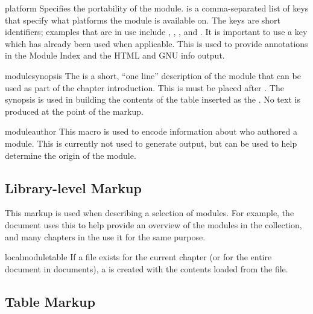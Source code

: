 \documentclass{howto}
\begin{document}
  \begin{macrodesc}{platform}{}
    Specifies the portability of the module.   is a
    comma-separated list of keys that specify what platforms the
    module is available on.  The keys are short identifiers;
    examples that are in use include , ,
    , and .  It is important to use a key
    which has already been used when applicable.  This is used to
    provide annotations in the Module Index and the HTML and GNU info
    output.
  \end{macrodesc}

  \begin{macrodesc}{modulesynopsis}{}
    The  is a short, ``one line'' description of the
    module that can be used as part of the chapter introduction.
    This is must be placed after .
    The synopsis is used in building the contents of the table
    inserted as the .  No text is
    produced at the point of the markup.
  \end{macrodesc}

  \begin{macrodesc}{moduleauthor}{}
    This macro is used to encode information about who authored a
    module.  This is currently not used to generate output, but can be
    used to help determine the origin of the module.
  \end{macrodesc}


  \subsection{Library-level Markup}

    This markup is used when describing a selection of modules.  For
    example, the  document uses this to help provide an overview of the
    modules in the collection, and many chapters in the
     use it for
    the same purpose.

  \begin{macrodesc}{localmoduletable}{}
    If a  file exists for the current
    chapter (or for the entire document in  documents), a
     is created with the contents loaded from the
     file.
  \end{macrodesc}


  \subsection{Table Markup}
\end{document}
